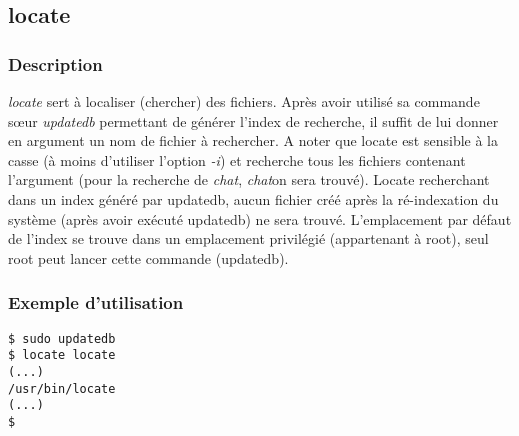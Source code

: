 \subsection*{locate}
\subsubsection*{Description}
\emph{locate} sert à localiser (chercher) des fichiers. Après avoir utilisé sa commande sœur \emph{updatedb} permettant de générer l'index de recherche, il suffit de lui donner en argument un nom de fichier à rechercher.
A noter que locate est sensible à la casse (à moins d'utiliser l'option \emph{-i}) et recherche tous les fichiers contenant l'argument (pour la recherche de \emph{chat}, \emph{chat}on sera trouvé).
Locate recherchant dans un index généré par updatedb, aucun fichier créé après la ré-indexation du système (après avoir exécuté updatedb) ne sera trouvé. L'emplacement par défaut de l'index se trouve dans un emplacement privilégié (appartenant à root), seul root peut lancer cette commande (updatedb).

\subsubsection*{Exemple d'utilisation}

\begin{lstlisting}
$ sudo updatedb
$ locate locate
(...)
/usr/bin/locate
(...)
$
\end{lstlisting}
